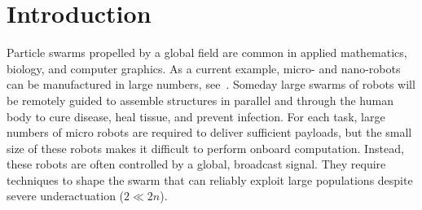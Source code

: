 \section{Introduction}\label{sec:Intro}
Particle swarms propelled by a global field are common in applied mathematics, biology, and computer graphics. 
As a current example, micro- and nano-robots can be manufactured in large numbers, see~\citep{Chowdhury2015,martel2014computer,kim2015imparting,Donald2013,Ghosh2009,Ou2013,qiu2015magnetic}.
Someday large swarms of robots will be remotely guided
to assemble structures in parallel and 
 through the human body to cure disease, heal tissue, and prevent infection. %
 For each task, large numbers of micro robots are required to deliver sufficient payloads, but the small size of these robots makes it difficult to perform onboard computation.  Instead, these robots are often controlled by a global, broadcast signal. 
They require techniques to shape the swarm that can reliably exploit large populations despite severe underactuation ($2 \ll2n$).  
 




